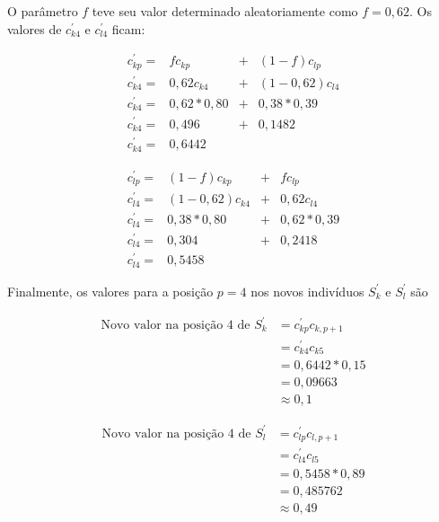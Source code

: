 O parâmetro $f$ teve seu valor determinado aleatoriamente como $f = 0,62$. Os valores de $c^{'}_{k4}$ e $c^{'}_{l4}$ ficam:

\begin{equation}\label{eq:ck4}
	\begin{array}{lccl}
		c^{'}_{kp} = & f c_{kp} & + & (1 - f) c_{lp} 						\\
		c^{'}_{k4} = & 0,62 c_{k4} & + & (1 - 0,62) c_{l4} 			\\
		c^{'}_{k4} = & 0,62 * 0,80 & + & 0,38 * 0,39 						\\		
		c^{'}_{k4} = & 0,496 & + & 0,1482	\\		
		c^{'}_{k4} = & 0,6442 &  & 
	\end{array}
\end{equation}

\begin{equation}\label{eq:cl4}
	\begin{array}{lccl}
		c^{'}_{lp} = & (1-f) c_{kp} & + & f c_{lp} 						\\
		c^{'}_{l4} = & (1-0,62) c_{k4} & + & 0,62 c_{l4} 						\\
		c^{'}_{l4} = & 0,38 * 0,80 & + & 0,62 * 0,39 						\\
		c^{'}_{l4} = & 0,304 & + & 0,2418 						\\
		c^{'}_{l4} = & 0,5458 &  & 
	\end{array}
\end{equation}

Finalmente, os valores para a posição $p = 4$ nos novos indivíduos $S^{'}_k$ e $S^{'}_l$ são

\begin{equation}\label{eq:cross2004_novo_valor_sk}
	\begin{array}{ll}
	\mbox{Novo valor na posição 4 de  } S^{'}_k & = c^{'}_{kp} c_{k,p+1} \\
								& = c^{'}_{k4} c_{k5} \\
								& = 0,6442 * 0,15	\\
								& = 0,09663	\\
								& \approx 0,1
	\end{array}
\end{equation}

\begin{equation}\label{eq:cross2004_novo_valor_sl}
	\begin{array}{ll}
	\mbox{Novo valor na posição 4 de  } S^{'}_l & = c^{'}_{lp} c_{l,p+1} \\
								& = c^{'}_{l4} c_{l5} \\
								& = 0,5458 * 0,89	\\
								& = 0,485762 \\
								& \approx  0,49
	\end{array}
\end{equation}


